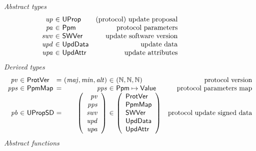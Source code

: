 \begin{figure}[htb]
  \emph{Abstract types}
  \begin{equation*}
    \begin{array}{r@{~\in~}lr}
      \var{up} & \UProp & \text{(protocol) update proposal}\\
      \var{pa} & \ProtPm & \text{protocol parameters}\\
      \var{swv} & \type{SWVer} & \text{update software version}\\
      \var{upd} & \type{UpdData} & \text{update data}\\
      \var{upa} & \type{UpdAttr} & \text{update attributes}\\
    \end{array}
  \end{equation*}
  \emph{Derived types}
  \begin{equation*}
    \begin{array}{r@{~\in~}l@{~=~}r@{~\in~}lr}
      \var{pv} & \ProtVer & (\var{maj}, \var{min}, \var{alt})
      & (\mathbb{N}, \mathbb{N}, \mathbb{N}) & \text{protocol version}\\
      \var{pps} & \PPMMap & \var{pps} & \ProtPm \mapsto \Value
                                             & \text{protocol parameters map}\\
      \var{pb} & \UPropSD
      &
        {\left(\begin{array}{r l}
                 \var{pv}\\
                 \var{pps}\\
                 \var{swv}\\
                 \var{upd}\\
                 \var{upa}\\
               \end{array}\right)}
      & {
        \left(
        \begin{array}{l}
          \ProtVer\\
          \PPMMap\\
          \type{SWVer}\\
          \type{UpdData}\\
          \type{UpdAttr}\\
        \end{array}
                   \right)
                   }
               & \text{protocol update signed data}
    \end{array}
  \end{equation*}
  \emph{Abstract functions}

\end{figure}
